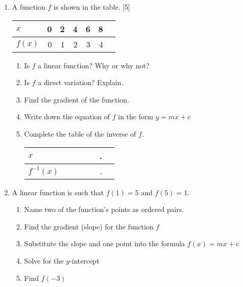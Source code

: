\documentclass[12pt, twoside]{article}
\begin{document}
\begin{enumerate}
  \newpage
  \item A function $f$ is shown in the table. \hfill [5]
  \begin{center}
    \begin{tabular}{|l|r|r|r|r|r|r|}
      \hline
      $x$ & 0 & 2 & 4 & 6 & 8\\ 
      \hline 
      $f(x)$ & 0 & 1 & 2 & 3 & 4\\ 
      \hline 
    \end{tabular}
  \end{center}
  \begin{enumerate}[itemsep=2.5cm]
    \item Is $f$ a linear function? Why or why not?
    \item Is $f$ a direct variation? Explain.
    \item Find the gradient of the function. \vspace{1cm}
    \item Write down the equation of $f$ in the form $y=mx+c$
    \item Complete the table of the inverse of $f$.
      \begin{center}
        \begin{tabular}{|l|r|r|r|r|r|r|}
          \hline
          $x$ & \hspace{1cm} & \hspace{1cm} & \hspace{1cm} & \hspace{1cm} & \hspace{1cm}.\\[1cm] 
          \hline 
          $f^{-1}(x)$ & \hspace{1cm} & \hspace{1cm} & \hspace{1cm} & \hspace{1cm} & \hspace{1cm}.\\[1cm] 
          \hline 
        \end{tabular}
      \end{center}
  \end{enumerate}

\newpage
\item A linear function is such that $f(1)=5$ and $f(5)=1$.
\begin{enumerate}[itemsep=1.5cm]
  \item Name two of the function's points as ordered pairs.
  \item Find the gradient (slope) for the function $f$
  \item Substitute the slope and one point into the formula $f(x)=mx+c$
  \item Solve for the $y$-intercept
  \item Find $f(-3)$
\end{enumerate} \vspace{1cm}


\end{enumerate}
\end{document}

